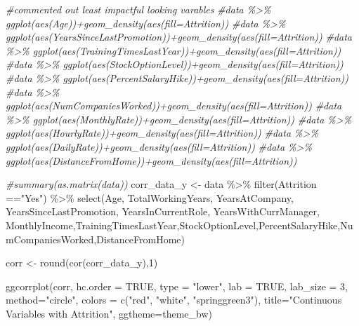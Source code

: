 \documentclass[
]{article}
\newenvironment{Shaded}{\begin{snugshade}}{\end{snugshade}}
\newcommand{\AttributeTok}[1]{\textcolor[rgb]{0.77,0.63,0.00}{#1}}
\newcommand{\CommentTok}[1]{\textcolor[rgb]{0.56,0.35,0.01}{\textit{#1}}}
\newcommand{\ConstantTok}[1]{\textcolor[rgb]{0.00,0.00,0.00}{#1}}
\newcommand{\DecValTok}[1]{\textcolor[rgb]{0.00,0.00,0.81}{#1}}
\newcommand{\FunctionTok}[1]{\textcolor[rgb]{0.00,0.00,0.00}{#1}}
\newcommand{\NormalTok}[1]{#1}
\newcommand{\OtherTok}[1]{\textcolor[rgb]{0.56,0.35,0.01}{#1}}
\newcommand{\SpecialCharTok}[1]{\textcolor[rgb]{0.00,0.00,0.00}{#1}}
\newcommand{\StringTok}[1]{\textcolor[rgb]{0.31,0.60,0.02}{#1}}
\begin{document}
\begin{Shaded}
\begin{Highlighting}[]
\CommentTok{\#commented out least impactful looking varables}
\CommentTok{\#data \%\textgreater{}\% ggplot(aes(Age))+geom\_density(aes(fill=Attrition))}
\CommentTok{\#data \%\textgreater{}\% ggplot(aes(YearsSinceLastPromotion))+geom\_density(aes(fill=Attrition))}
\CommentTok{\#data \%\textgreater{}\% ggplot(aes(TrainingTimesLastYear))+geom\_density(aes(fill=Attrition))}
\CommentTok{\#data \%\textgreater{}\% ggplot(aes(StockOptionLevel))+geom\_density(aes(fill=Attrition))}
\CommentTok{\#data \%\textgreater{}\% ggplot(aes(PercentSalaryHike))+geom\_density(aes(fill=Attrition))}
\CommentTok{\#data \%\textgreater{}\% ggplot(aes(NumCompaniesWorked))+geom\_density(aes(fill=Attrition))}
\CommentTok{\#data \%\textgreater{}\% ggplot(aes(MonthlyRate))+geom\_density(aes(fill=Attrition))}
\CommentTok{\#data \%\textgreater{}\% ggplot(aes(HourlyRate))+geom\_density(aes(fill=Attrition))}
\CommentTok{\#data \%\textgreater{}\% ggplot(aes(DailyRate))+geom\_density(aes(fill=Attrition))}
\CommentTok{\#data \%\textgreater{}\% ggplot(aes(DistanceFromHome))+geom\_density(aes(fill=Attrition))}
\end{Highlighting}
\end{Shaded}

\begin{Shaded}
\begin{Highlighting}[]
\CommentTok{\#summary(as.matrix(data))}
\NormalTok{corr\_data\_y }\OtherTok{\textless{}{-}}\NormalTok{ data }\SpecialCharTok{\%\textgreater{}\%} \FunctionTok{filter}\NormalTok{(Attrition }\SpecialCharTok{==}\StringTok{"Yes"}\NormalTok{) }\SpecialCharTok{\%\textgreater{}\%} \FunctionTok{select}\NormalTok{(Age, TotalWorkingYears, YearsAtCompany, YearsSinceLastPromotion, YearsInCurrentRole, YearsWithCurrManager, MonthlyIncome,TrainingTimesLastYear,StockOptionLevel,PercentSalaryHike,NumCompaniesWorked,DistanceFromHome)}

\NormalTok{corr }\OtherTok{\textless{}{-}} \FunctionTok{round}\NormalTok{(}\FunctionTok{cor}\NormalTok{(corr\_data\_y),}\DecValTok{1}\NormalTok{)}

\FunctionTok{ggcorrplot}\NormalTok{(corr, }\AttributeTok{hc.order =} \ConstantTok{TRUE}\NormalTok{, }
           \AttributeTok{type =} \StringTok{"lower"}\NormalTok{, }
           \AttributeTok{lab =} \ConstantTok{TRUE}\NormalTok{, }
           \AttributeTok{lab\_size =} \DecValTok{3}\NormalTok{, }
           \AttributeTok{method=}\StringTok{"circle"}\NormalTok{, }
           \AttributeTok{colors =} \FunctionTok{c}\NormalTok{(}\StringTok{"red"}\NormalTok{, }\StringTok{"white"}\NormalTok{, }\StringTok{"springgreen3"}\NormalTok{), }
           \AttributeTok{title=}\StringTok{"Continuous Variables with Attrition"}\NormalTok{, }
           \AttributeTok{ggtheme=}\NormalTok{theme\_bw)}
\end{Highlighting}
\end{Shaded}
\end{document}
